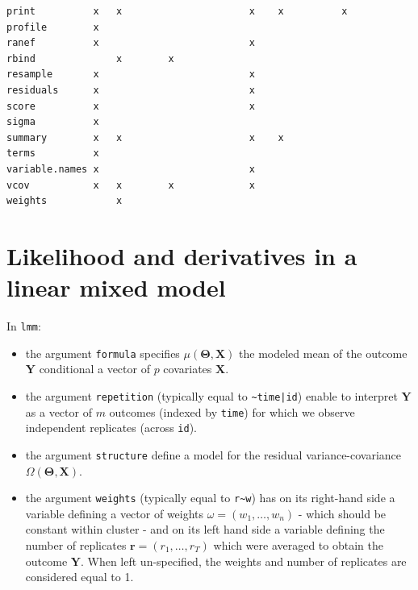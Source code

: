 \documentclass[12pt]{article}
\newcommand{\param}{\Theta}
\newcommand{\Vparam}{\boldsymbol{\param}}
\newcommand{\VX}{\boldsymbol{X}}
\newcommand{\VY}{\boldsymbol{Y}}
\begin{document}
\begin{verbatim}
print          x   x                      x    x          x          
profile        x                                                     
ranef          x                          x                          
rbind              x        x                                        
resample       x                          x                          
residuals      x                          x                          
score          x                          x                          
sigma          x                                                     
summary        x   x                      x    x                     
terms          x                                                     
variable.names x                          x                          
vcov           x   x        x             x                          
weights            x
\end{verbatim}

\clearpage
\section{Likelihood and derivatives in a linear mixed model}
\label{SM:likelihood}
In \texttt{lmm}:
\begin{itemize}
\item the argument \texttt{formula} specifies \(\mu(\Vparam,\VX)\) the modeled
mean of the outcome \(\VY\) conditional a vector of \(p\) covariates
\(\VX\).
\item the argument \texttt{repetition} (typically equal to \texttt{\textasciitilde{}time|id}) enable to
interpret \(\VY\) as a vector of \(m\) outcomes (indexed by \texttt{time})
for which we observe independent replicates (across \texttt{id}).
\item the argument \texttt{structure} define a model for the residual
variance-covariance \(\Omega(\Vparam,\VX)\).
\item the argument \texttt{weights} (typically equal to \texttt{r\textasciitilde{}w}) has on its
right-hand side a variable defining a vector of weights
\(\omega=(w_1,\ldots,w_n)\) - which should be constant within
cluster - and on its left hand side a variable defining the number
of replicates \(\mathbf{r}=(r_{1},\ldots,r_{T})\) which were
averaged to obtain the outcome \(\VY\). When left un-specified, the
weights and number of replicates are considered equal to 1.
\end{itemize}
\end{document}
